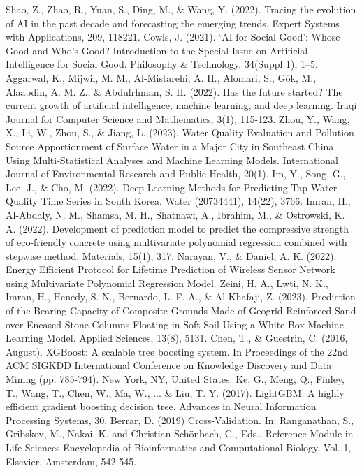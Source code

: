 \documentclass[12pt,a4paper]{article}
\begin{document}
\begin{enumerate}
\begin{thebibliography}{99}
 Shao, Z., Zhao, R., Yuan, S., Ding, M., \& Wang, Y. (2022). Tracing the evolution of AI in the past decade and forecasting the emerging trends. Expert Systems with Applications, 209, 118221.
 Cowls, J. (2021). ‘AI for Social Good’: Whose Good and Who’s Good? Introduction to the Special Issue on Artificial Intelligence for Social Good. Philosophy \& Technology, 34(Suppl 1), 1–5. 
 Aggarwal, K., Mijwil, M. M., Al-Mistarehi, A. H., Alomari, S., Gök, M., Alaabdin, A. M. Z., \& Abdulrhman, S. H. (2022). Has the future started? The current growth of artificial intelligence, machine learning, and deep learning. Iraqi Journal for Computer Science and Mathematics, 3(1), 115-123.
 Zhou, Y., Wang, X., Li, W., Zhou, S., \& Jiang, L. (2023). Water Quality Evaluation and Pollution Source Apportionment of Surface Water in a Major City in Southeast China Using Multi-Statistical Analyses and Machine Learning Models. International Journal of Environmental Research and Public Health, 20(1). 
 Im, Y., Song, G., Lee, J., \& Cho, M. (2022). Deep Learning Methods for Predicting Tap-Water Quality Time Series in South Korea. Water (20734441), 14(22), 3766. 
 Imran, H., Al-Abdaly, N. M., Shamsa, M. H., Shatnawi, A., Ibrahim, M., \& Ostrowski, K. A. (2022). Development of prediction model to predict the compressive strength of eco-friendly concrete using multivariate polynomial regression combined with stepwise method. Materials, 15(1), 317.
 Narayan, V., \& Daniel, A. K. (2022). Energy Efficient Protocol for Lifetime Prediction of Wireless Sensor Network using Multivariate Polynomial Regression Model.
 Zeini, H. A., Lwti, N. K., Imran, H., Henedy, S. N., Bernardo, L. F. A., \& Al-Khafaji, Z. (2023). Prediction of the Bearing Capacity of Composite Grounds Made of Geogrid-Reinforced Sand over Encased Stone Columns Floating in Soft Soil Using a White-Box Machine Learning Model. Applied Sciences, 13(8), 5131.
 Chen, T., \& Guestrin, C. (2016, August). XGBoost: A scalable tree boosting system. In Proceedings of the 22nd ACM SIGKDD International Conference on Knowledge Discovery and Data Mining (pp. 785-794). New York, NY, United States.
 Ke, G., Meng, Q., Finley, T., Wang, T., Chen, W., Ma, W., ... \& Liu, T. Y. (2017). LightGBM: A highly efficient gradient boosting decision tree. Advances in Neural Information Processing Systems, 30.
 Berrar, D. (2019) Cross-Validation. In: Ranganathan, S., Gribskov, M., Nakai, K. and Christian Schönbach, C., Eds., Reference Module in Life Sciences Encyclopedia of Bioinformatics and Computational Biology, Vol. 1, Elsevier, Amsterdam, 542-545.

\end{thebibliography}
\end{enumerate}
\end{document}
